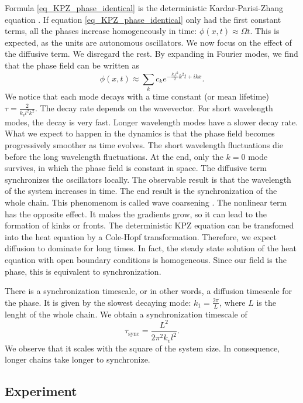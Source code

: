 \documentclass[11pt, a4paper]{article} %
\begin{document}
Formula \eqref{eq_KPZ_phase_identical} is the deterministic Kardar-Parisi-Zhang equation \cite{KPZ}. 
If equation \eqref{eq_KPZ_phase_identical} only had the first constant terms, all the phases increase homogeneously 
in time: $\phi(x,t) \approx \Omega t$. This is expected, as the units are autonomous oscillators. 
We now focus on the effect of the diffusive term. We disregard the rest. By expanding in Fourier modes, 
we find that the phase field can be written as
\begin{equation}
    \phi(x,t) \approx \sum_k c_k e^{-\frac{k_vl^2}{2}k^2 t + ikx}.
\end{equation}
We notice that each mode decays with a time constant (or mean lifetime) $\tau = \frac{2}{k_vl^2k^2}$.
The decay rate depends on the wavevector. 
For short wavelength modes, the decay is very fast. Longer wavelength modes have a slower decay rate. %
What we expect to happen in the dynamics is that the phase field becomes progressively smoother as time evolves. 
The short wavelength fluctuations die before the long wavelength fluctuations. At the end, only the $k=0$ mode survives, 
in which the phase field is constant in space. The diffusive term synchronizes the oscillators locally. 
The observable result is that the wavelength of the system increases in time. The end result is the synchronization of the 
whole chain. This phenomenom is called wave coarsening \cite{veenstra}. 
The nonlinear term has the opposite effect. It makes the gradients grow, so it can lead to the 
formation of kinks or fronts. 
The deterministic KPZ equation can be transfomed into the heat equation by a Cole-Hopf transformation. 
Therefore, we expect diffusion to dominate for long times. In fact,
the steady state solution of the heat equation with open boundary conditions is homogeneous. 
Since our field is the phase, this is equivalent to synchronization. 

There is a synchronization timescale, or in other words, a diffusion timescale for the phase. 
It is given by the slowest decaying mode: $k_1 = \frac{2\pi}{L}$, where $L$ is the lenght of the whole chain. 
We obtain a synchronization timescale of 
\begin{equation}
    \tau_{\text{sync}} = \frac{L^2}{2\pi^2 k_v l^2}.
    \label{eq:sync_timescale}
\end{equation}
We observe that it scales with the square of the system size. In consequence, longer chains take longer to synchronize. 


\subsection{Experiment}
\label{subsec:chain_exp}
\end{document}
